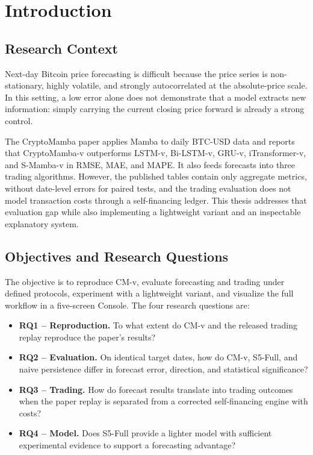 \documentclass[13pt,a4paper,oneside]{report}
\begin{document}
\cleardoublepage
{}

\chapter{Introduction}\label{chap:intro}

\section{Research Context}\label{sec:motivation}
Next-day Bitcoin price forecasting is difficult because the price series is non-stationary, highly
volatile, and strongly autocorrelated at the absolute-price scale. In this setting, a low error
alone does not demonstrate that a model extracts new information: simply carrying the current
closing price forward is already a strong control.

The CryptoMamba paper \cite{cryptomamba} applies Mamba \cite{mamba} to daily BTC-USD data and
reports that CryptoMamba-v outperforms LSTM-v, Bi-LSTM-v, GRU-v, iTransformer-v, and S-Mamba-v in
RMSE, MAE, and MAPE. It also feeds forecasts into three trading algorithms. However, the published
tables contain only aggregate metrics, without date-level errors for paired tests, and the trading
evaluation does not model transaction costs through a self-financing ledger. This thesis addresses
that evaluation gap while also implementing a lightweight variant and an inspectable explanatory
system.

\section{Objectives and Research Questions}\label{sec:rq}
The objective is to reproduce CM-v, evaluate forecasting and trading under defined protocols,
experiment with a lightweight variant, and visualize the full workflow in a five-screen Console.
The four research questions are:
\begin{itemize}
\item \textbf{RQ1 -- Reproduction.} To what extent do CM-v and the released trading replay reproduce
the paper's results?
\item \textbf{RQ2 -- Evaluation.} On identical target dates, how do CM-v, S5-Full, and naive
persistence differ in forecast error, direction, and statistical significance?
\item \textbf{RQ3 -- Trading.} How do forecast results translate into trading outcomes when the
paper replay is separated from a corrected self-financing engine with costs?
\item \textbf{RQ4 -- Model.} Does S5-Full provide a lighter model with sufficient experimental
evidence to support a forecasting advantage?
\end{itemize}
\end{document}
